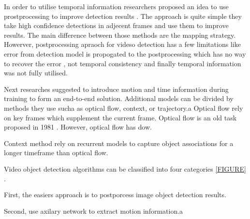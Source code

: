
In order to utilise temporal information researchers proposed an idea to use prostprocessing to improve detection results \cite{TODO}. The approach is quite simple they take high confidence detections in adjecent frames and use them to improve results. The main difference between those methods are the mapping strategy. Howerver, postprocessing apraoch for videso detection has a few limitations like error from detection model is propogated to the postprocessing which has no way to recover the error \cite{}, not temporal consistency \cite{} and finally temporal information was not fully utilised.

Next researches suggested to introduce motion and time information during training to form an end-to-end solution. Additional models can be divided by methods they use sucha as optical flow, context, or trajectory.a
Optical flow rely on key frames which supplement the current frame. Optical flow is an old task proposed in 1981 \cite{TODO}. However, optical flow has dow.

Context method rely on recurrent models to capture object associations for a longer timeframe than optical flow.


Video object detection algorithms can be classified into four categories \ref{FIGURE} \cite{TODO}.

First, the easiers approach is to postporcess image object detection results.

Second, use axilary network to extract motion information.a

